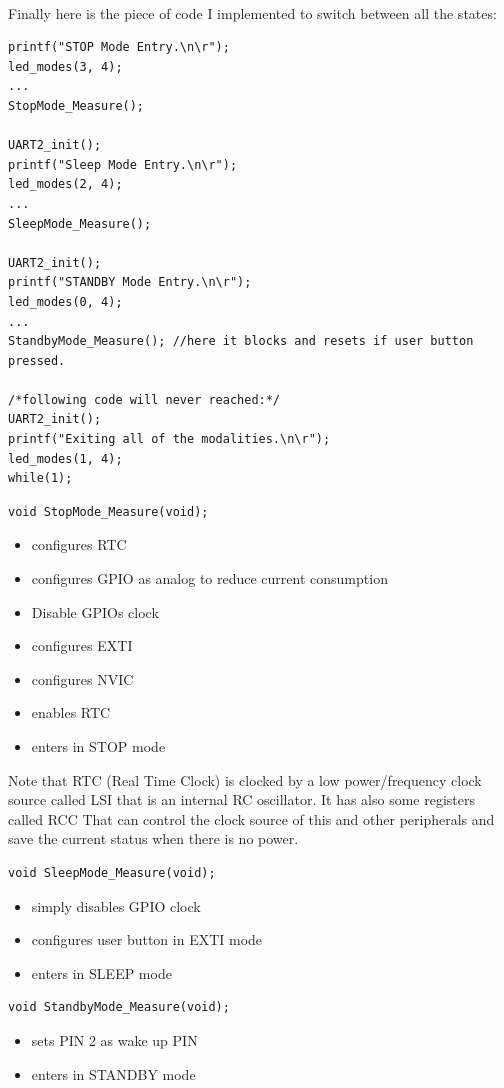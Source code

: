 \documentclass[peerreview]{IEEEtran}
\begin{document}
\\Finally here is the piece of code I implemented to switch between all the states:
\begin{lstlisting}[style=CStyle]
printf("STOP Mode Entry.\n\r");
led_modes(3, 4);
...
StopMode_Measure();
	
UART2_init();
printf("Sleep Mode Entry.\n\r");
led_modes(2, 4);
...
SleepMode_Measure();
	
UART2_init();
printf("STANDBY Mode Entry.\n\r");
led_modes(0, 4);
...
StandbyMode_Measure(); //here it blocks and resets if user button pressed.

/*following code will never reached:*/
UART2_init();
printf("Exiting all of the modalities.\n\r");
led_modes(1, 4);
while(1);
\end{lstlisting}
\begin{lstlisting}[style=CStyle]
void StopMode_Measure(void);
\end{lstlisting}
\begin{itemize}
\item configures RTC
\item configures GPIO as analog to reduce current consumption
\item Disable GPIOs clock 
\item configures EXTI
\item configures NVIC
\item enables RTC
\item enters in STOP mode
\end{itemize}
Note that RTC (Real Time Clock) is clocked by a low power/frequency clock source called LSI that is an internal RC oscillator. It has also some registers called RCC That can control the clock source of this and other peripherals and save the current status when there is no power.
\begin{lstlisting}[style=CStyle]
void SleepMode_Measure(void);
\end{lstlisting}
\begin{itemize}
\item simply disables GPIO clock
\item configures user button in EXTI mode
\item enters in SLEEP mode
\end{itemize}
\begin{lstlisting}[style=CStyle]
void StandbyMode_Measure(void);
\end{lstlisting}
\begin{itemize}
\item sets PIN 2 as wake up PIN
\item enters in STANDBY mode
\end{itemize}
\end{document}
